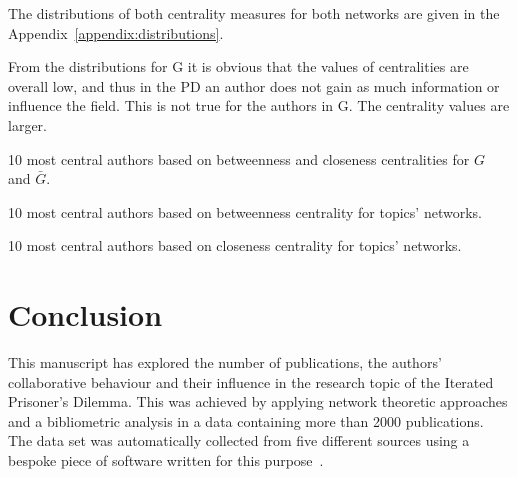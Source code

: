 \documentclass{article}
\theoremstyle{definition}
\begin{document}
The distributions of both centrality measures for both networks are given in
the Appendix~\ref{appendix:distributions}.

From the distributions for G it is obvious that the values of centralities are overall low,
and thus in the PD an author does not gain as much information or influence
the field. This is not true for the authors in G. The centrality values are
larger.

\begin{table}[!hbtp]
    \begin{center}
    \resizebox{.9\textwidth}{!}{}
\end{center}
\caption{10 most central authors based on betweenness and closeness centralities
for \(G\) and \(\bar{G}\).}\label{table:central_authors}
\end{table}

\begin{table}[!hbtp]
    \begin{center}
    \resizebox{.9\textwidth}{!}{}
\end{center}
\caption{10 most central authors based on betweenness centrality
for topics' networks.}\label{table:central_authors_bc_topics}
\end{table}

\begin{table}[!hbtp]
    \begin{center}
    \resizebox{.9\textwidth}{!}{}
\end{center}
\caption{10 most central authors based on closeness centrality
for topics' networks.}\label{table:central_authors_cc_topics}
\end{table}

\section{Conclusion}\label{section:conclusion}

This manuscript has explored the number of publications, the authors'
collaborative behaviour and their influence in the research topic of the Iterated
Prisoner's Dilemma. This was achieved by applying network theoretic approaches and
a bibliometric analysis in a data containing more than 2000 publications.
The data set was automatically
collected from five different sources using a bespoke piece of software written
for this purpose~\cite{nikoleta_2017}.
\end{document}
